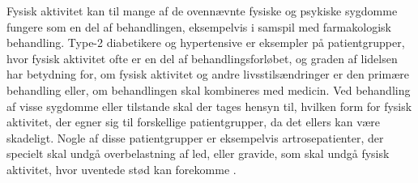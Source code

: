 Fysisk aktivitet kan til mange af de ovennævnte fysiske og psykiske sygdomme fungere som en del af behandlingen, eksempelvis i samspil med farmakologisk behandling. Type-2 diabetikere og hypertensive er eksempler på patientgrupper, hvor fysisk aktivitet ofte er en del af behandlingsforløbet, og graden af lidelsen har betydning for, om fysisk aktivitet og andre livsstilsændringer er den primære behandling eller, om behandlingen skal kombineres med medicin. Ved behandling af visse sygdomme eller tilstande skal der tages hensyn til, hvilken form for fysisk aktivitet, der egner sig til forskellige patientgrupper, da det ellers kan være skadeligt. Nogle af disse patientgrupper er eksempelvis artrosepatienter, der specielt skal undgå overbelastning af led, eller gravide, som skal undgå fysisk aktivitet, hvor uventede stød kan forekomme \citep{pedersen2011,andersen2001}.
